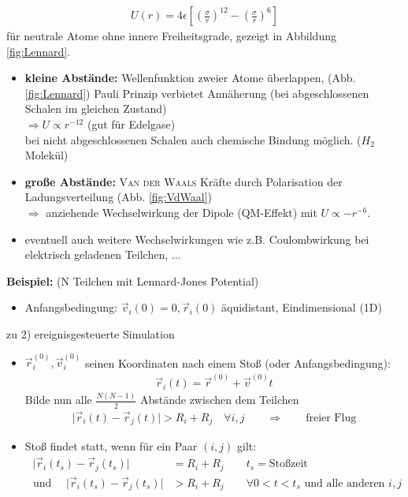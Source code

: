 \documentclass[12pt]{article}
\begin{document}
\begin{align}
U(r) = 
4 \epsilon 
\left[ \left(  \frac{ \sigma }{r}  \right)^{12} - \left( \frac{\sigma }{r} \right)^6 \right]
\end{align}
für neutrale Atome ohne innere Freiheitsgrade, gezeigt in Abbildung \ref{fig:Lennard}.
\begin{itemize}
\item \textbf{kleine Abstände:} Wellenfunktion zweier Atome überlappen, (Abb. \ref{fig:Lennard})
 Pauli Prinzip verbietet Annäherung (bei abgeschlossenen Schalen im gleichen Zustand) \\ $\Rightarrow U \propto r^{-12}$ (gut für Edelgase) \\ bei nicht abgeschlossenen Schalen auch chemische Bindung möglich. ($H_2$ Molekül)
\item \textbf{große Abstände:} \textsc{Van der Waals} Kräfte durch Polarisation der Ladungsverteilung (Abb. \ref{fig:VdWaal}) \\
$\Rightarrow$ anziehende Wechselwirkung der Dipole (QM-Effekt) mit $U \propto - r^{-6}$.
\item eventuell auch weitere Wechselwirkungen wie z.B. Coulombwirkung bei elektrisch geladenen Teilchen, ...
\end{itemize}
\textbf{Beispiel:} (N Teilchen mit Lennard-Jones Potential)
\begin{itemize}
\item Anfangsbedingung: $\vec{v}_i (0)=0, \vec{r}_i (0)$ äquidistant, Eindimensional (1D) 
\end{itemize} %
zu 2) ereignisgesteuerte Simulation
\begin{itemize}
\item $\vec{r}_i^{(0)}, \vec{v}_i^{(0)}$ seinen Koordinaten nach einem Stoß (oder Anfangsbedingung): 
\begin{align*}
\vec{r}_i (t) = \vec{r}^{(0)} + \vec{v}^{(0)} t
\end{align*} Bilde nun alle $\frac{N(N-1)}{2}$ Abstände zwischen dem Teilchen 
\begin{align*}
\vert \vec{r}_i (t) - \vec{r}_j (t) \vert > R_i + R_j \quad \forall i,j \qquad \Rightarrow \qquad  \text{freier Flug}
\end{align*}
\item Stoß findet statt, wenn für ein Paar $(i,j)$ gilt:
\begin{align*}
\; \vert \vec{r}_i (t_s) - \vec{r}_j (t_s) \vert &= R_i + R_j   \qquad t_s = \text{Stoßzeit} \\
\text{ und } \quad  \vert \vec{r}_i (t_s) - \vec{r}_j (t_s) \vert &> R_i + R_j \qquad \forall 0< t < t_s \text{ und alle anderen } i,j
\end{align*} 
\end{itemize}
\end{document}
